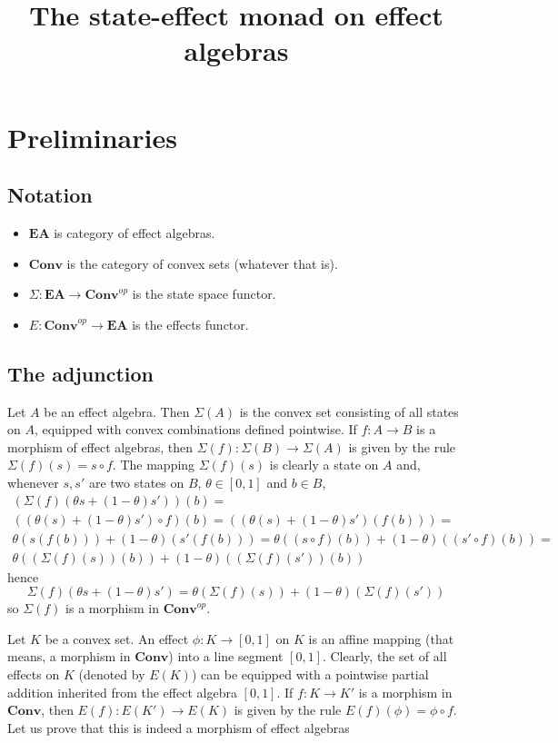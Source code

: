 \documentclass{amsart}
\newcommand{\EA}{\mathbf{EA}}
\newcommand{\Conv}{\mathbf{Conv}}
\newcommand{\Convop}{\mathbf{Conv}^{op}}
\newcommand{\states}{\Sigma}
\newcommand{\effects}{E}
\begin{document}
\title{The state-effect monad on effect algebras}

\section{Preliminaries}
\subsection{Notation}
\begin{itemize}
\item $\EA$ is category of effect algebras.
\item $\Conv$ is the category of convex sets (whatever that is).
\item $\states:\EA\to\Convop$ is the state space functor.
\item $\effects:\Convop\to\EA$ is the effects functor.
\end{itemize}
\subsection{The adjunction}
Let $A$ be an effect algebra. Then $\states(A)$ is the convex set consisting of all states
on $A$, equipped with convex combinations defined pointwise. If $f:A\to B$ is a morphism
of effect algebras, then $\states(f):\states(B)\to\states(A)$ is given by the 
rule $\states(f)(s)=s\circ f$. The mapping $\states(f)(s)$ is clearly a
state on $A$ and, whenever $s,s'$ are two states on $B$, $\theta\in[0,1]$ and $b\in B$,
\begin{align*}
(\states(f)(\theta s+(1-\theta)s'))(b)=\\
((\theta(s)+(1-\theta)s')\circ f)(b)=
((\theta(s)+(1-\theta)s')(f(b)))=\\
\theta(s(f(b)))+(1-\theta)(s'(f(b)))=
\theta((s\circ f)(b))+(1-\theta)((s' \circ f)(b))=\\
\theta((\states(f)(s))(b))+(1-\theta)((\states(f)(s'))(b))
\end{align*}
hence
$$
\states(f)(\theta s+(1-\theta)s')=
\theta(\states(f)(s))+(1-\theta)(\states(f)(s'))
$$
so $\states(f)$ is a morphism in $\Convop$.

Let $K$ be a convex set. An effect $\phi:K\to[0,1]$ on $K$ is an affine mapping 
(that means, a morphism in $\Conv$) into a line segment $[0,1]$. Clearly, the set of all effects on $K$ 
(denoted by $\effects(K)$) can be equipped with a pointwise partial addition inherited from the effect algebra 
$[0,1]$. If $f:K\to K'$ is a morphism in $\Conv$, then $E(f):E(K')\to E(K)$ is given by the rule
$E(f)(\phi)=\phi\circ f$. Let us prove that this is indeed a morphism of effect algebras
\end{document}
